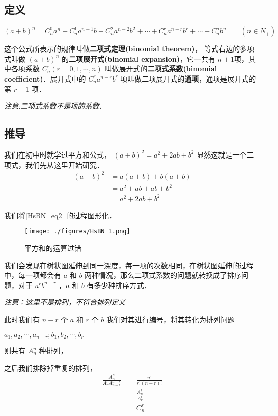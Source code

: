 

\subsection{定义}
\begin{equation}
(a + b)^n = C_n^0a^n + C_n^1a^{n- 1}b + C_n^2a^{n- 2}b^2 + \cdots + C_n^ra^{n-r}b^r + \cdots + C_n^nb^n \qquad (n\in N_{+})
\end{equation}

这个公式所表示的规律叫做\textbf{二项式定理(binomial theorem)}，
等式右边的多项式叫做 $(a+b)^n$ 的\textbf{二项展开式(binomial expansion)}，它一共有 $n+1$项，其中各项系数 $C_n^r(r = 0, 1, \cdots, n)$ 叫做展开式的\textbf{二项式系数(binomial coefficient)}．展开式中的 $C_n^ra^{n-r}b^r$ 项叫做二项展开式的\textbf{通项}，通项是展开式的第 $r+1$ 项．

\textsl{注意:二项式系数不是项的系数．}

\subsection{推导}
我们在初中时就学过平方和公式， $(a+b)^2 = a^2 + 2ab + b^2$ 显然这就是一个二项式，我们先从这里开始研究．
\begin{equation}\label{HsBN_eq2}
\begin{aligned}
(a+b)^2 &= a(a + b) + b(a + b)\\
&= a^2 + ab + ab + b^2\\
&= a^2 + 2ab + b^2
\end{aligned}
\end{equation}

我们将\autoref{HsBN_eq2} 的过程图形化．

\begin{figure}[ht]
\centering
\texttt{[image: ./figures/HsBN\_1.png]}
\caption{平方和的运算过错} \label{HsBN_fig1}
\end{figure}

我们会发现在树状图延伸到同一深度，每一项的次数相同，在树状图延伸的过程中，每一项都会有 $a$ 和 $b$ 两种情况，那么二项式系数的问题就转换成了排序问题，对于 $a^rb^{n-r}$ ，$a$ 和 $b$ 有多少种排序方式．

\textsl{注意：这里不是排列，不符合排列定义}

此时我们有 $n-r$ 个 $a$ 和 $r$ 个 $b$ 我们对其进行编号，将其转化为排列问题

$a_1,a_2,\cdots,a_{n-r};b_1,b_2,\cdots,b_r$

 
则共有 $A_n^n$ 种排列，

之后我们排除掉重复的排列，
\begin{equation}
\begin{aligned}
\frac{A_n^n}{A_r^rA_{n-r}^{n-r}} &= \frac{n!}{r!(n-r)!}\\
&= \frac{A_n^r}{A_r^r}\\
&= C_n^r
\end{aligned}
\end{equation}
